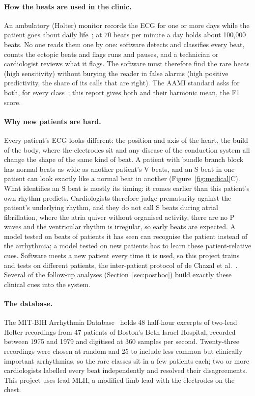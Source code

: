 \documentclass[11pt]{article}
\begin{document}
\paragraph{How the beats are used in the clinic.} An ambulatory (Holter) monitor records the ECG for one or more days while the
patient goes about daily life~\cite{steinberg2017}; at 70 beats per minute a day holds about 100,000 beats. No one reads them one by
one: software detects and classifies every beat, counts the ectopic beats and flags runs and pauses, and a technician or cardiologist
reviews what it flags. The software must therefore find the rare beats (high sensitivity) without burying the reader in false alarms
(high positive predictivity, the share of its calls that are right). The AAMI standard asks for both, for every
class~\cite{aami2012ec57}; this report gives both and their harmonic mean, the F1 score.

\paragraph{Why new patients are hard.} Every patient's ECG looks different: the position and axis of the heart, the build of the
body, where the electrodes sit and any disease of the conduction system all change the shape of the same kind of beat. A patient with
bundle branch block has normal beats as wide as another patient's V beats, and an S beat in one patient can look exactly like a normal
beat in another (Figure~\ref{fig:medical}C). What identifies an S beat is mostly its timing: it comes earlier than this patient's own
rhythm predicts. Cardiologists therefore judge prematurity against the patient's underlying rhythm, and they do not call S beats during
atrial fibrillation, where the atria quiver without organised activity, there are no P waves and the ventricular rhythm is irregular,
so early beats are expected. A model tested on beats of patients it has seen can recognise the patient instead of the arrhythmia; a
model tested on new patients has to learn these patient-relative cues. Software meets a new patient every time it is used, so this
project trains and tests on different patients, the inter-patient protocol of de Chazal et al.~\cite{dechazal2004}. Several of the
follow-up analyses (Section~\ref{sec:posthoc}) build exactly these clinical cues into the system.

\paragraph{The database.} The MIT-BIH Arrhythmia Database~\cite{moody2001,goldberger2000} holds 48 half-hour excerpts of two-lead
Holter recordings from 47 patients of Boston's Beth Israel Hospital, recorded between 1975 and 1979 and digitised at 360 samples per
second. Twenty-three recordings were chosen at random and 25 to include less common but clinically important arrhythmias, so the rare
classes sit in a few patients each; two or more cardiologists labelled every beat independently and resolved their disagreements. This
project uses lead MLII, a modified limb lead with the electrodes on the chest.
\end{document}
